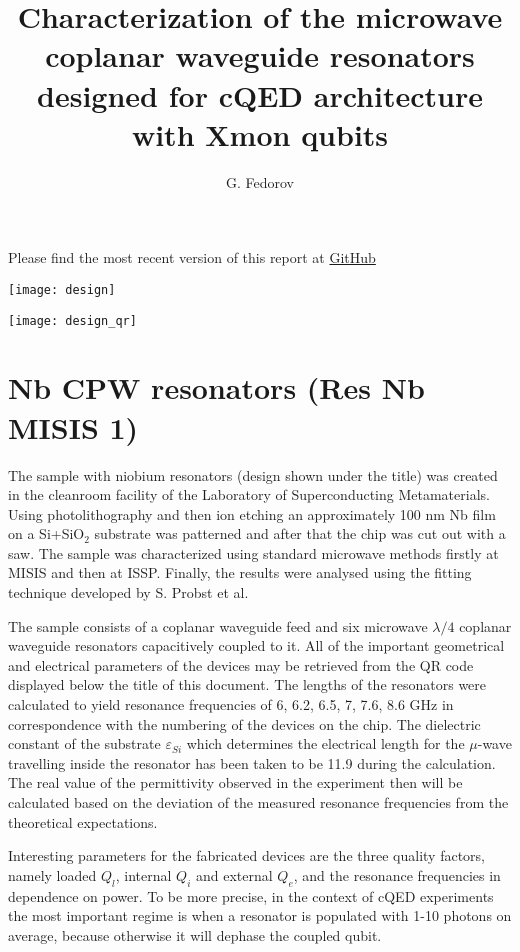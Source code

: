 \documentclass[12pt]{article}
\title{Characterization of the microwave coplanar waveguide resonators designed for cQED architecture with Xmon qubits}
\author{G. Fedorov}
\numberwithin{equation}{section}
\numberwithin{figure}{section}
\begin{document}
\maketitle

\begin{center}
Please find the most recent version of this report at \href{https://github.com/vdrhtc/Xmons/blob/master/Resonators/build/resonators.pdf}{GitHub}

\texttt{[image: design]}

\texttt{[image: design\_qr]}
\end{center}

\tableofcontents
\newpage

\section{Nb CPW resonators (Res Nb MISIS 1)}\label{sec:res_nb_misis_1}

The sample with niobium resonators (design shown under the title) was created in the cleanroom facility of the Laboratory of Superconducting Metamaterials. Using photolithography and then ion etching an approximately 100 nm Nb film on a Si+SiO$_2$ substrate was patterned and after that the chip was cut out with a saw. The sample was characterized using standard microwave methods firstly at MISIS and then at ISSP. Finally, the results were analysed using the fitting technique developed\cite{probst2015} by S. Probst et al.

The sample consists of a coplanar waveguide feed and six microwave $\lambda/4$ coplanar waveguide resonators capacitively coupled to it. All of the important geometrical and electrical parameters of the devices may be retrieved from the QR code displayed below the title of this document. The lengths of the resonators were calculated to yield resonance frequencies of 6, 6.2, 6.5, 7, 7.6, 8.6 GHz in correspondence with the numbering of the devices on the chip. The dielectric constant of the substrate $\varepsilon_{Si}$ which determines the electrical length for the $\mu$-wave travelling inside the resonator has been taken to be 11.9 during the calculation. The real value of the permittivity observed in the experiment then will be calculated based on the deviation of the measured resonance frequencies from the theoretical expectations.

Interesting parameters for the fabricated devices are the three quality factors, namely loaded $Q_l$, internal $Q_i$ and external $Q_e$, and the resonance frequencies in dependence on power. To be more precise, in the context of cQED experiments the most important regime is when a resonator is populated with 1-10 photons on average, because otherwise it will dephase the coupled qubit. 
\end{document}
